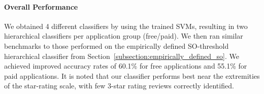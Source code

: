 \documentclass[11pt]{report} %
\begin{document}
\paragraph{Overall Performance}
We obtained 4 different classifiers by using the trained SVMs, resulting in two hierarchical classifiers per application group (free/paid). We then ran similar benchmarks to those performed on the empirically defined SO-threshold hierarchical classifier from Section~\ref{subsection:empirically_defined_so}. We achieved improved accuracy rates of 60.1\% for free applications and 55.1\% for paid applications. It is noted that our classifier performs best near the extremities of the star-rating scale, with few 3-star rating reviews correctly identified.

\end{document}

